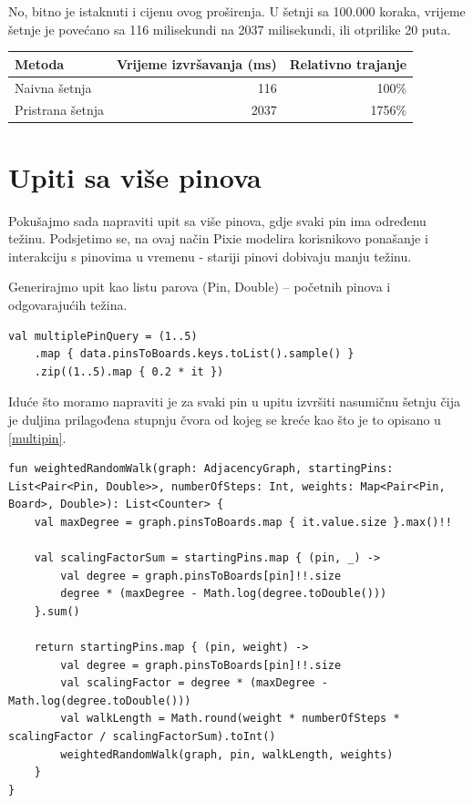 \documentclass[times, utf8, seminar]{fer}
\begin{document}
No, bitno je istaknuti i cijenu ovog proširenja. U šetnji sa 100.000 koraka, vrijeme šetnje je povećano sa 116 milisekundi na 2037 milisekundi, ili otprilike 20 puta.

\begin{center}
		  \begin{tabular}{ |l|r|r| }
					 \hline
					 Metoda & Vrijeme izvršavanja (ms) & Relativno trajanje\\
					 \hline
					 Naivna šetnja & 116 & 100\% \\
					 \hline
					 Pristrana šetnja & 2037 & 1756\% \\
					 \hline
		  \end{tabular}
\end{center}

\section{Upiti sa više pinova}

Pokušajmo sada napraviti upit sa više pinova, gdje svaki pin ima određenu težinu. Podsjetimo se, na ovaj način Pixie modelira korisnikovo ponašanje i interakciju s pinovima u vremenu - stariji pinovi dobivaju manju težinu.

Generirajmo upit kao listu parova (Pin, Double) -- početnih pinova i odgovarajućih težina.

\begin{lstlisting}
val multiplePinQuery = (1..5)
	.map { data.pinsToBoards.keys.toList().sample() }
	.zip((1..5).map { 0.2 * it })
\end{lstlisting}

Iduće što moramo napraviti je za svaki pin u upitu izvršiti nasumičnu šetnju čija je duljina prilagođena stupnju čvora od kojeg se kreće kao što je to opisano u \ref{multipin}.

\begin{lstlisting}
fun weightedRandomWalk(graph: AdjacencyGraph, startingPins: List<Pair<Pin, Double>>, numberOfSteps: Int, weights: Map<Pair<Pin, Board>, Double>): List<Counter> {
    val maxDegree = graph.pinsToBoards.map { it.value.size }.max()!!

    val scalingFactorSum = startingPins.map { (pin, _) ->
        val degree = graph.pinsToBoards[pin]!!.size
        degree * (maxDegree - Math.log(degree.toDouble()))
    }.sum()

    return startingPins.map { (pin, weight) ->
        val degree = graph.pinsToBoards[pin]!!.size
        val scalingFactor = degree * (maxDegree - Math.log(degree.toDouble()))
        val walkLength = Math.round(weight * numberOfSteps * scalingFactor / scalingFactorSum).toInt()
        weightedRandomWalk(graph, pin, walkLength, weights)
    }
}
\end{lstlisting}
\end{document}
